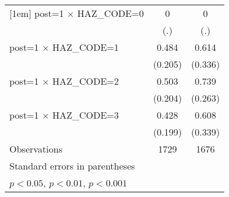 {\begin{tabular}{l*{2}{c}}
[1em]
post=1 $\times$ HAZ\_CODE=0&           0         &           0         \\
                    &         (.)         &         (.)         \\
[1em]
post=1 $\times$ HAZ\_CODE=1&       0.484\sym{*}  &       0.614         \\
                    &     (0.205)         &     (0.336)         \\
[1em]
post=1 $\times$ HAZ\_CODE=2&       0.503\sym{*}  &       0.739\sym{**} \\
                    &     (0.204)         &     (0.263)         \\
[1em]
post=1 $\times$ HAZ\_CODE=3&       0.428\sym{*}  &       0.608         \\
                    &     (0.199)         &     (0.339)         \\
\hline
Observations        &        1729         &        1676         \\
\hline\hline
\multicolumn{3}{l}{\footnotesize Standard errors in parentheses}\\
\multicolumn{3}{l}{\footnotesize \sym{*} \(p<0.05\), \sym{**} \(p<0.01\), \sym{***} \(p<0.001\)}\\
\end{tabular}
}
